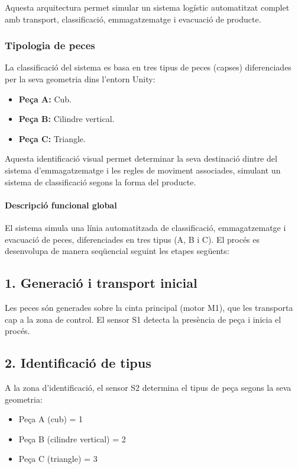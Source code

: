 \documentclass[12pt,a4paper]{report}
\begin{document}
Aquesta arquitectura permet simular un sistema logístic automatitzat complet amb transport, classificació, emmagatzematge i evacuació de producte.

\subsubsection{Tipologia de peces}

La classificació del sistema es basa en tres tipus de peces (capses) diferenciades per la seva geometria dins l'entorn Unity:

\begin{itemize}
\item \textbf{Peça A:} Cub.
\item \textbf{Peça B:} Cilindre vertical.
\item \textbf{Peça C:} Triangle.
\end{itemize}


Aquesta identificació visual permet determinar la seva destinació dintre del sistema d'emmagatzematge i les regles de moviment associades, simulant un sistema de classificació segons la forma del producte. 


\paragraph{Descripció funcional global}

El sistema simula una línia automatitzada de classificació, emmagatzematge i evacuació de peces, diferenciades en tres tipus (A, B i C). El procés es desenvolupa de manera seqüencial seguint les etapes següents:

\subsection*{1. Generació i transport inicial}

Les peces són generades sobre la cinta principal (motor M1), que les transporta cap a la zona de control. El sensor S1 detecta la presència de peça i inicia el procés.

\subsection*{2. Identificació de tipus}

A la zona d'identificació, el sensor S2 determina el tipus de peça segons la seva geometria:

\begin{itemize}
\item Peça A (cub) = 1
\item Peça B (cilindre vertical) = 2
\item Peça C (triangle) = 3
\end{itemize}
\end{document}
